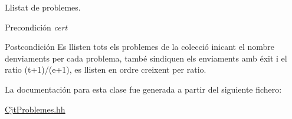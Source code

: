 Llistat de problemes. 

\begin{DoxyPrecond}{Precondición}
{\itshape cert} 
\end{DoxyPrecond}
\begin{DoxyPostcond}{Postcondición}
Es llisten tots els problemes de la colecció inicant el nombre d\textquotesingle{}enviaments per cada problema, també s\textquotesingle{}indiquen els enviaments amb éxit i el ratio (t+1)/(e+1), es llisten en ordre creixent per ratio. 
\end{DoxyPostcond}


La documentación para esta clase fue generada a partir del siguiente fichero\+:\begin{DoxyCompactItemize}
\item 
\mbox{\hyperlink{_cjt_problemes_8hh}{Cjt\+Problemes.\+hh}}\end{DoxyCompactItemize}

